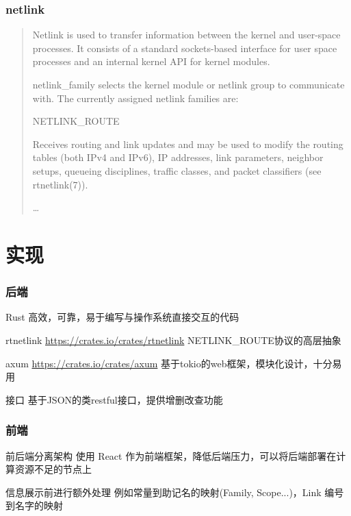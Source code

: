 \documentclass{ctexbeamer}
\begin{document}
\begin{frame}[fragile]
\frametitle{netlink}
\begin{quotation}
  Netlink is used to transfer information between the kernel and
  user-space processes. It consists of a standard sockets-based
  interface for user space processes and an internal kernel API for
  kernel modules.

  netlink\_family selects the kernel module or netlink group to
  communicate with. The currently assigned netlink families are:

  \begin{adjustwidth}{0.5cm}{}
    NETLINK\_ROUTE
  \end{adjustwidth}

  \begin{adjustwidth}{1cm}{}
    Receives routing and link updates and may be used to
    modify the routing tables (both IPv4 and IPv6), IP
    addresses, link parameters, neighbor setups, queueing
    disciplines, traffic classes, and packet classifiers (see
    rtnetlink(7)).
  \end{adjustwidth}

  \ldots
\end{quotation}
\end{frame}

\section{实现}
\begin{frame}
\frametitle{后端}
\begin{exampleblock}{Rust}
高效，可靠，易于编写与操作系统直接交互的代码
\end{exampleblock}
\begin{exampleblock}{rtnetlink \url{https://crates.io/crates/rtnetlink}}
NETLINK\_ROUTE协议的高层抽象
\end{exampleblock}
\begin{exampleblock}{axum \url{https://crates.io/crates/axum}}
基于tokio的web框架，模块化设计，十分易用
\end{exampleblock}
\begin{block}{接口}
基于JSON的类restful接口，提供增删改查功能  
\end{block}
\end{frame}

\begin{frame}
  \frametitle{前端}

  \begin{block}{前后端分离架构}
    使用 React 作为前端框架，降低后端压力，可以将后端部署在计算资源不足的节点上
  \end{block}
  \begin{block}{信息展示前进行额外处理}
    例如常量到助记名的映射(Family, Scope...)，Link 编号到名字的映射
  \end{block}
\end{frame}
\end{document}
